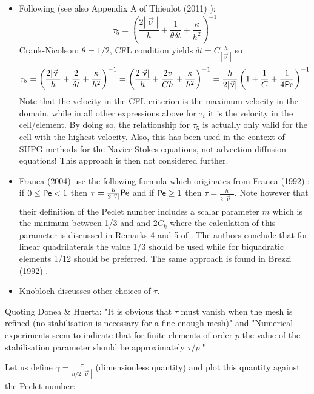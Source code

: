 \begin{itemize}
\item Following \cite{teos00} (see also Appendix A of Thieulot (2011) \cite{thie11}):
\[
\tau_5 = \left( \frac{2 |\vec{\upnu}|}{h} + \frac{1}{\theta \delta t} + \frac{\kappa}{h^2} \right)^{-1}  
\]
Crank-Nicolson: $\theta=1/2$, CFL condition yields $\delta t = C \frac{h}{|\vec\upnu|}$ so 
\[
\tau_5 = \left( \frac{2 |\vec{\upnu}|}{h} + \frac{2}{\delta t}+  \frac{\kappa}{h^2}  \right)^{-1}  
= \left( \frac{2 |\vec{\upnu}|}{h} + \frac{2 v}{C h} +  \frac{\kappa}{h^2}  \right)^{-1}  
= \frac{h}{2 |\vec{\upnu}|}  \left( 1 + \frac{1}{C} + \frac{1}{4 {\mathsf{Pe}}} \right)^{-1} \nonumber 
\]
Note that the velocity in the CFL criterion is the maximum velocity in the domain, while 
in all other expressions above for $\tau_i$ it is the velocity in the cell/element. 
By doing so, the relationship  for $\tau_5$ is actually only valid for the cell with the 
highest velocity. 
Also, this has been used in the context of SUPG methods for the Navier-Stokes equations, 
not advection-diffusion equations! This approach is then not considered further.

\item Franca \etal (2004) \cite{frhm04} use the following formula which originates from 
Franca \etal (1992) \cite{frfh92}: if $0\le {\mathsf{Pe}} < 1$ then
$\tau = \frac{h}{2 |\vec\upnu|} {\mathsf{Pe}}$ and if ${\mathsf{Pe}} \ge 1$ then $\tau = \frac{h}{2 |\vec\upnu|}$.
Note however that their definition of the Peclet number includes a scalar parameter $m$ which is 
the minimum between 1/3 and and 2$C_k$ where the calculation of this parameter is discussed in 
Remarks 4 and 5 of \cite{frfh92}. The authors conclude that for linear quadrilaterals the value
1/3 should be used while for biquadratic elements 1/12 should be preferred.
The same approach is found in Brezzi \etal (1992) \cite{brbf92}. 

\item Knobloch \cite{knob08} discusses other choices of $\tau$.

\end{itemize}

Quoting Donea \& Huerta: "It is obvious that $\tau$ must vanish when the mesh is refined (no stabilisation
is necessary for a fine enough mesh)" and "Numerical experiments seem to indicate that for 
finite elements of order $p$ the value of the stabilisation parameter should be approximately 
$\tau/p$."

Let us define $\gamma=\frac{\tau}{h/2|\vec\upnu|}$ (dimensionless quantity) and 
plot this quantity against the Peclet number:

